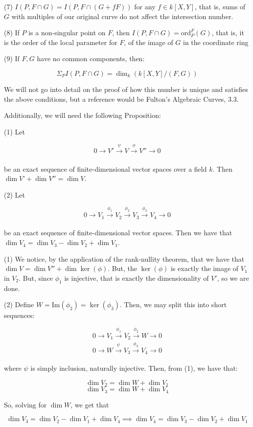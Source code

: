 \documentclass[10pt]{article}
\begin{document}
(7) $I(P, F \cap G) = I(P, F \cap (G + fF))$ for any $f \in k[X,Y]$, that is, sums of $G$ with multiples of our original curve do not affect the intersection number.

(8) If $P$ is a non-singular point on $F$, then $I(P, F \cap G) = \text{ord}_P^F(G)$, that is, it is the order of the local parameter for $F$, of the image of $G$ in the coordinate ring

(9) If $F,G$ have no common components, then:

$$ \Sigma_P  I(P,F \cap G) = \dim_k(k[X,Y]/(F,G)) $$

We will not go into detail on the proof of how this number is unique and satisfies the above conditions, but a reference would be Fulton’s Algebraic Curves, 3.3.

Additionally, we will need the following Proposition:

(1) Let 

$$ 0 \to V' \xrightarrow[]{\psi} V  \xrightarrow[]{\phi} V'' \to 0 $$

be an exact sequence of finite-dimensional vector spaces over a field $k$. Then $\dim V’ + \dim V''= \dim V$.

(2) Let

$$ 0 \to V_1 \xrightarrow[]{\phi_1} V_2 \xrightarrow[]{\phi_2} V_3 \xrightarrow[]{\phi_3} V_4 \to 0 $$

be an exact sequence of finite-dimensional vector spaces. Then we have that $\dim V_4 = \dim V_3 - \dim V_2 + \dim V_1$.

(1) We notice, by the application of the rank-nullity theorem, that we have that $\dim V = \dim V'' + \dim \ker(\phi)$. But, the $\ker(\phi)$ is exactly the image of $V_1$ in $V_2$. But, since $\phi_1$ is injective, that is exactly the dimensionality of $V'$, so we are done.

(2) Define $W = \text{Im}(\phi_2) = \ker(\phi_3)$. Then, we may split this into short sequences:

$$ 0 \to  V_1 \xrightarrow[]{\phi_1} V_2 \xrightarrow[]{\phi_2} W \to 0 $$
$$ 0 \to W \xrightarrow[]{\psi} V_3  \xrightarrow[]{\phi_3} V_4 \to 0 $$

where $\psi$ is simply inclusion, naturally injective. Then, from (1), we have that:

$$\dim V_2 = \dim W + \dim V_1$$
$$ \dim V_3 = \dim W + \dim V_4$$

So, solving for $\dim W$, we get that

$$ \dim V_3 = \dim V_2 - \dim V_1 + \dim V_4 \implies \dim V_4 = \dim V_3 - \dim V_2 + \dim V_1$$
\end{document}
